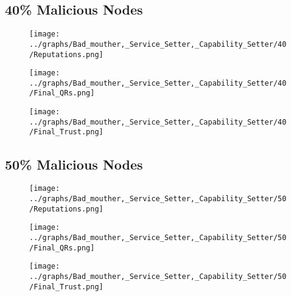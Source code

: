 \documentclass{article}
\begin{document}
  \begin{minipage}[t]{0.49\columnwidth}
    \subsection*{40\% Malicious Nodes}
        \begin{figure}[H]
            \centering
            \texttt{[image: ../graphs/Bad\_mouther,\_Service\_Setter,\_Capability\_Setter/40/Reputations.png]}
        \end{figure}
        \begin{figure}[H]
            \centering
            \texttt{[image: ../graphs/Bad\_mouther,\_Service\_Setter,\_Capability\_Setter/40/Final\_QRs.png]}
        \end{figure}
    \end{minipage}
    \begin{minipage}[t]{0.49\columnwidth}
        \begin{figure}[H]
            \centering
            \texttt{[image: ../graphs/Bad\_mouther,\_Service\_Setter,\_Capability\_Setter/40/Final\_Trust.png]}
        \end{figure}
    \end{minipage}

  \begin{minipage}[t]{0.49\columnwidth}
    \subsection*{50\% Malicious Nodes}
        \begin{figure}[H]
            \centering
            \texttt{[image: ../graphs/Bad\_mouther,\_Service\_Setter,\_Capability\_Setter/50/Reputations.png]}
        \end{figure}
        \begin{figure}[H]
            \centering
            \texttt{[image: ../graphs/Bad\_mouther,\_Service\_Setter,\_Capability\_Setter/50/Final\_QRs.png]}
        \end{figure}
    \end{minipage}
    \begin{minipage}[t]{0.49\columnwidth}
        \begin{figure}[H]
            \centering
            \texttt{[image: ../graphs/Bad\_mouther,\_Service\_Setter,\_Capability\_Setter/50/Final\_Trust.png]}
        \end{figure}
    \end{minipage}
\end{document}
